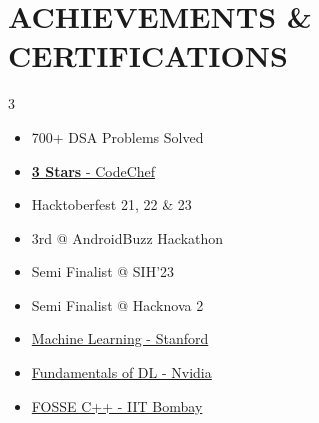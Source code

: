 \documentclass[letterpaper,11pt]{article}
\newcommand\sbullet[1][.5]{\mathbin{\vcenter{\hbox{\scalebox{#1}{$\bullet$}}}}}
\begin{document}
 
\section{ACHIEVEMENTS \& CERTIFICATIONS}
 \vspace{-1pt}

        \begin{multicols}{3}
            \begin{itemize}[itemsep=-4pt]
                \item 700+ DSA Problems Solved
                \item \href{https://www.codechef.com/users/ruthlessruler}{\textbf{3 Stars} - CodeChef {\raisebox{-0.1\height}{\faArrowUpRightFromSquare}} }
                \item Hacktoberfest 21, 22 \& 23
                \item 3rd @ AndroidBuzz Hackathon
                \item Semi Finalist @ SIH'23
                \item Semi Finalist @ Hacknova 2
                \item \href{https://coursera.org/share/c715d24542b410805a2ff3034949858d}{Machine Learning - Stanford {\raisebox{-0.1\height}{\faArrowUpRightFromSquare} }}
                \item \href{https://courses.nvidia.com/certificates/b38a698150c5410c9afeb954cf87468c/}{Fundamentals of DL - Nvidia {\raisebox{-0.1\height}{\faArrowUpRightFromSquare} }}
                \item \href{https://drive.google.com/file/d/10mALMGuQrSt5Pmxue66Xjh8aFSsbpBtX/view}{FOSSE C++ - IIT Bombay {\raisebox{-0.1\height}{\faArrowUpRightFromSquare} }}

            \end{itemize}
        \end{multicols}

\end{document}
